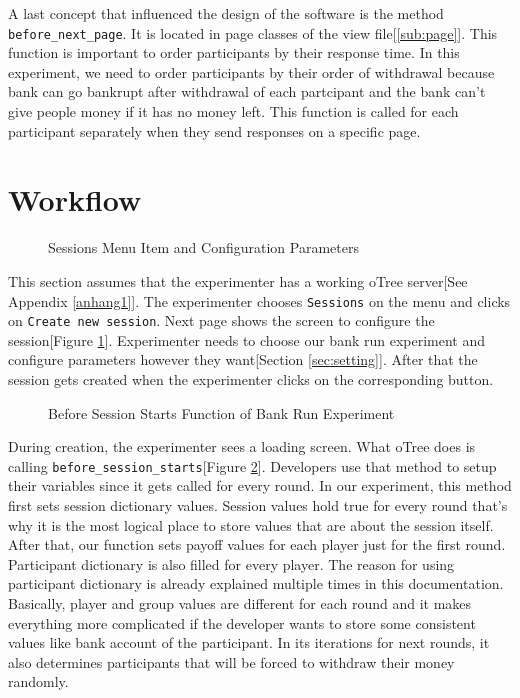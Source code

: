 A last concept that influenced the design of the software is the method \verb|before_next_page|. It is located in page classes of the view file[\ref{sub:page}]. This function is important to order participants by their response time. In this experiment, we need to order participants by their order of withdrawal because bank can go bankrupt after withdrawal of each partcipant and the bank can't give people money if it has no money left. This function is called for each participant separately when they send responses on a specific page.

\section{Workflow}

\begin{figure}[h]
	\centerline{}
	\caption{Sessions Menu Item and Configuration Parameters }
	\label{fig:picture13}
	
\end{figure}

This section assumes that the experimenter has a working oTree server[See Appendix \ref{anhang1}]. The experimenter chooses \verb|Sessions| on the menu and clicks on \verb|Create new session|. Next page shows the screen to configure the session[Figure \ref{fig:picture13}]. Experimenter needs to choose our bank run experiment and configure parameters however they want[Section \ref{sec:setting}]. After that the session gets created when the experimenter clicks on the corresponding button.


\begin{figure}[h]
	\centerline{}
	\caption{Before Session Starts Function of Bank Run Experiment }
	\label{fig:picture14}
\end{figure}

During creation, the experimenter sees a loading screen. What oTree does is calling \verb|before_session_starts|[Figure \ref{fig:picture14}]. Developers use that method to setup their variables since it gets called for every round. In our experiment, this method first sets session dictionary values. Session values hold true for every round that's why it is the most logical place to store values that are about the session itself. After that, our function sets payoff values for each player just for the first round. Participant dictionary is also filled for every player. The reason for using participant dictionary is already explained multiple times in this documentation. Basically, player and group values are different for each round and it makes everything more complicated if the developer wants to store some consistent values like bank account of the participant. In its iterations for next rounds, it also determines participants that will be forced to withdraw their money randomly. 

